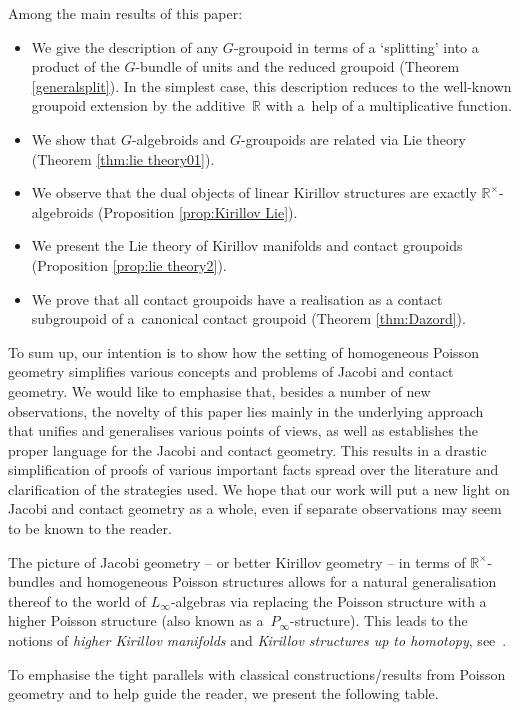 \documentclass[10pt,a4paper]{amsart}
\newcommand{\R}{{\mathbb R}}
\def\Rt{{\R^\times}}
\numberwithin{equation}{section}
\begin{document}
Among the main results of this paper:
\begin{itemize}\itemsep=0pt
\item We give the description of any $G$-groupoid in terms of a `splitting' into a product of the $G$-bundle of units and the reduced groupoid (Theorem \ref{generalsplit}). In the simplest case, this description reduces to the well-known groupoid extension by the additive~$\R$ with a~help of a multiplicative function.
\item We show that $G$-algebroids and $G$-groupoids are related via Lie theory (Theorem \ref{thm:lie theory01}).
\item We observe that the dual objects of linear Kirillov structures are exactly $\Rt$-algebroids (Proposition \ref{prop:Kirillov Lie}).
\item We present the Lie theory of Kirillov manifolds and contact groupoids (Proposition \ref{prop:lie theory2}).
\item We prove that all contact groupoids have a realisation as a contact subgroupoid of a~cano\-ni\-cal contact groupoid (Theorem \ref{thm:Dazord}).
\end{itemize}
%
To sum up, our intention is to show how the setting of homogeneous Poisson geometry simplif\/ies various concepts and problems of Jacobi and contact geometry. We would like to emphasise that, besides a number of new observations, the novelty of this paper lies mainly in the underlying approach that unif\/ies and generalises various points of views, as well as establishes the proper language for the Jacobi and contact geometry. This results in a drastic simplif\/ication of proofs of various important facts spread over the literature and clarif\/ication of the strategies used. We hope that our work will put a new light on Jacobi and contact geometry as a whole, even if separate observations may seem to be known to the reader.

\begin{Remark} The picture of Jacobi geometry -- or better Kirillov geometry -- in terms of $\Rt$-bundles and homogeneous Poisson structures allows for a natural generalisation thereof to the world of $L_{\infty}$-algebras via replacing the Poisson structure with a higher Poisson structure (also known as a~$P_{\infty}$-structure). This leads to the notions of \emph{higher Kirillov manifolds} and \emph{Kirillov structures up to homotopy}, see~\cite{Bruce:2016}.
\end{Remark}

To emphasise the tight parallels with classical constructions/results from Poisson geometry and to help guide the reader, we present the following table.
\end{document}
